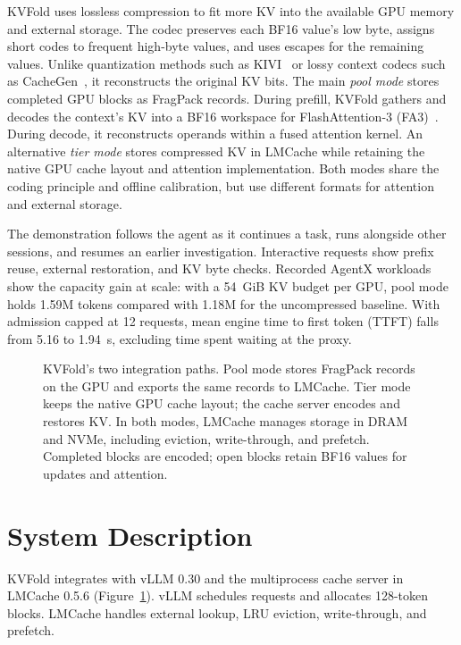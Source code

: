 \documentclass[conference]{IEEEtran}
\begin{document}
KVFold uses lossless compression to fit more KV into the available GPU
memory and external storage. The codec preserves each BF16 value's low
byte, assigns short codes to frequent high-byte values, and uses escapes
for the remaining values. Unlike quantization methods such as
KIVI~\cite{kivi} or lossy context codecs such as CacheGen~\cite{cachegen},
it reconstructs the original KV bits. The main \emph{pool mode} stores
completed GPU blocks as FragPack records. During prefill, KVFold gathers
and decodes the context's KV into a BF16 workspace for FlashAttention-3
(FA3)~\cite{fa3}. During decode, it reconstructs operands within a fused
attention kernel. An alternative \emph{tier mode} stores compressed KV in
LMCache while retaining the native GPU cache layout and attention
implementation. Both modes share the coding principle and offline
calibration, but use different formats for attention and external
storage.

The demonstration follows the agent as it continues a task, runs alongside
other sessions, and resumes an earlier investigation. Interactive requests
show prefix reuse, external restoration, and KV byte checks.
Recorded AgentX workloads~\cite{agentx} show the capacity gain at scale:
with a 54~GiB KV budget per GPU, pool mode holds 1.59M tokens compared
with 1.18M for the uncompressed baseline. With admission capped at
12 requests, mean engine time to first token (TTFT) falls from 5.16 to
1.94~s, excluding time spent waiting at the proxy.

\begin{figure}[t]
\centering

\caption{KVFold's two integration paths. Pool mode stores FragPack records
on the GPU and exports the same records to LMCache. Tier mode keeps the
native GPU cache layout; the cache server encodes and restores KV.
In both modes, LMCache manages storage in DRAM and NVMe, including eviction,
write-through, and prefetch. Completed blocks are encoded; open blocks retain
BF16 values for updates and attention.}
\label{fig:architecture}
\end{figure}

\section{System Description}
\label{sec:design}
KVFold integrates with vLLM 0.30 and the multiprocess cache server in
LMCache 0.5.6 (Figure~\ref{fig:architecture}). vLLM schedules requests and
allocates 128-token blocks. LMCache handles external lookup, LRU eviction,
write-through, and prefetch.
\end{document}
